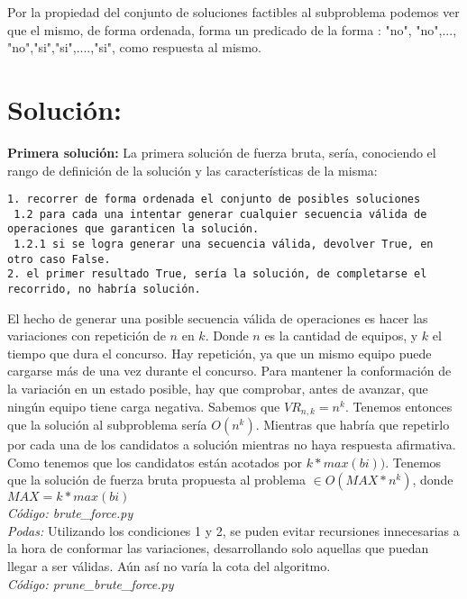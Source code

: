 \documentclass{article}
\begin{document}
Por la propiedad del conjunto de soluciones factibles al subproblema podemos ver que el mismo, de forma ordenada, forma un predicado de la forma : "no", "no",..., "no","si","si",....,"si", como respuesta al mismo.\\

\section{Soluci\'on:}

\textbf{Primera soluci\'on:} La primera soluci\'on de fuerza bruta, ser\'ia, conociendo el rango de definici\'on de la soluci\'on y las caracter\'isticas de la misma: \\

\begin{verbatim}
1. recorrer de forma ordenada el conjunto de posibles soluciones
 1.2 para cada una intentar generar cualquier secuencia válida de operaciones que garanticen la solución.
 1.2.1 si se logra generar una secuencia válida, devolver True, en otro caso False.
2. el primer resultado True, sería la solución, de completarse el recorrido, no habría solución.
\end{verbatim}

El hecho de generar una posible secuencia v\'alida de operaciones es hacer las variaciones con repetici\'on de $n$ en $k$. Donde $n$ es la cantidad de equipos, y $k$ el tiempo que dura el concurso. Hay repetici\'on, ya que un mismo equipo puede cargarse m\'as de una vez durante el concurso. Para mantener la conformaci\'on de la variaci\'on en un estado posible, hay que comprobar, antes de avanzar, que ning\'un equipo tiene carga negativa. Sabemos que $VR_{n,k} = n^k$. Tenemos entonces que la soluci\'on al subproblema ser\'ia $O(n^k)$. Mientras que habr\'ia que repetirlo por cada una de los candidatos a soluci\'on mientras no haya respuesta afirmativa. Como tenemos que los candidatos est\'an acotados por $k*max(bi))$. Tenemos que la soluci\'on de fuerza bruta propuesta al problema $\in O(MAX*n^k)$, donde $MAX=k*max(bi)$\\
\textit{C\'odigo: brute\_force.py}\\

\textit{Podas:} Utilizando los condiciones 1 y 2, se puden evitar recursiones innecesarias a la hora de conformar las variaciones, desarrollando solo aquellas que puedan llegar a ser v\'alidas. A\'un as\'i no var\'ia la cota del algoritmo.\\
\textit{C\'odigo: prune\_brute\_force.py}\\
\end{document}
